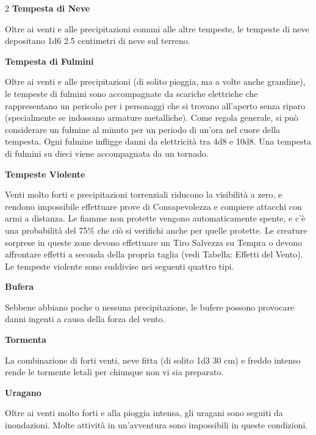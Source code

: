 \begin{multicols}{2}
\textbf{Tempesta di Neve}

Oltre ai venti e alle precipitazioni comuni alle altre tempeste, le tempeste di neve depositano 1d6 \texttimes{} 2.5 centimetri di neve sul terreno.

\textbf{Tempesta di Fulmini}

Oltre ai venti e alle precipitazioni (di solito pioggia, ma a volte anche grandine), le tempeste di fulmini sono accompagnate da scariche elettriche che rappresentano un pericolo per i personaggi che si trovano all'aperto senza riparo (specialmente se indossano armature metalliche). Come regola generale, si può considerare un fulmine al minuto per un periodo di un'ora nel cuore della tempesta. Ogni fulmine infligge danni da elettricità tra 4d8 e 10d8. Una tempesta di fulmini su dieci viene accompagnata da un tornado.

\textbf{Tempeste Violente}

Venti molto forti e precipitazioni torrenziali riducono la visibilità a zero, e rendono impossibile effettuare prove di Consapevolezza e compiere attacchi con armi a distanza. Le fiamme non protette vengono automaticamente spente, e c'è una probabilità del 75\% che ciò si verifichi anche per quelle protette. Le creature sorprese in queste zone devono effettuare un Tiro Salvezza su Tempra o devono affrontare effetti a seconda della propria taglia (vedi Tabella: Effetti del Vento). Le tempeste violente sono suddivise nei seguenti quattro tipi.




\textbf{Bufera}

Sebbene abbiano poche o nessuna precipitazione, le bufere possono provocare danni ingenti a causa della forza del vento.

\textbf{Tormenta}

La combinazione di forti venti, neve fitta (di solito 1d3 \texttimes{} 30 cm) e freddo intenso rende le tormente letali per chiunque non vi sia preparato.

\textbf{Uragano}

Oltre ai venti molto forti e alla pioggia intensa, gli uragani sono seguiti da inondazioni. Molte attività in un'avventura sono impossibili in queste condizioni.


\end{multicols}
